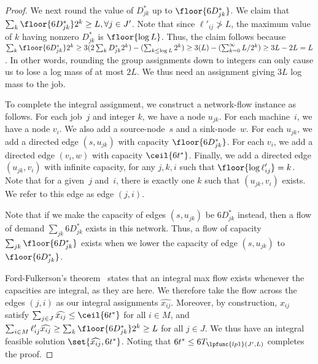 \begin{proof}
  We next round the value of $D^*_{jk}$ up to $\floor{6D^*_{jk}}$.  We
  claim that $\sum_k \floor{6D^*_{jk}} 2^k \geq L, \forall j\in J'$.
  Note that since $\ell'_{ij} \not> L$, the maximum value of $k$
  having nonzero $D^*_{jk}$ is $\floor{\log L}$.  Thus, the claim
  follows because $\sum_k \floor{6D^*_{jk}} 2^k \geq 3 (2\sum_k
  D^*_{jk} 2^k) - (\sum_{k\leq \log{L}} 2^k) \geq 3 (L)
  - (\sum_{k=0}^{\infty} L / 2^k) \geq 3L - 2L = L$.  In other words,
  rounding the group assignments down to integers can only cause us to
  lose a log mass of at most $2L$.  We thus need an assignment giving
  $3L$ log mass to the job.  
  
  To complete the integral assignment, we construct a network-flow
  instance as follows.  For each job~$j$ and integer $k$, we have a
  node $u_{jk}$.  For each machine~$i$, we have a node $v_i$.  We also
  add a source-node~$s$ and a sink-node~$w$.  For each $u_{jk}$, we
  add a directed edge $(s,u_{jk})$ with capacity $\floor{6D^*_{jk}}$.
  For each $v_i$, we add a directed edge $(v_i,w)$ with capacity
  $\ceil{6t^*}$.  Finally, we add a directed edge $(u_{jk},v_i)$ with
  infinite capacity, for any $j,k,i$ such that $\floor{\log
    \ell'_{ij}} = k$.  Note that for a given~$j$ and~$i$, there is
  exactly one $k$ such that $(u_{jk},v_i)$ exists.  We refer to this
  edge as edge $(j,i)$.
   
   Note that if we make the capacity of edges $(s,u_{jk})$ be
  $6D^*_{jk}$ instead, then a flow of
  demand $\sum_{jk} 6D^*_{jk}$ exists in this network.
  Thus, a flow of capacity $\sum_{jk} \floor{6D^*_{jk}}$ exists 
  when we lower the capacity of edge $(s,u_{jk})$ to $\floor{6D^*_{jk}}$.
  
  Ford-Fulkerson's theorem~\cite{FordFu62,CormenLeRi01} states that an
  integral max flow exists whenever the capacities are integral, as
  they are here.  We therefore take the flow across the edges $(j,i)$
  as our integral assignments $\widehat{x_{ij}}$.  Moreover, by
  construction, $\widehat{x_{ij}}$ satisfy $\sum_{j\in J}
  \widehat{x_{ij}} \leq \ceil{6t^*}$ for all $i\in M$, and $\sum_{i
    \in M} \ell'_{ij}\widehat{x_{ij}} \geq \sum_k \floor{6D^*_{jk}}
  2^k \geq L$ for all $j \in J$.  We thus have an integral feasible
  solution $\set{\widehat{x_{ij}},6t^*}$.  Noting that $6t^* \leq
  6T_{\lpfunc{lp1}(J',L)}$ completes the proof.
\end{proof}

